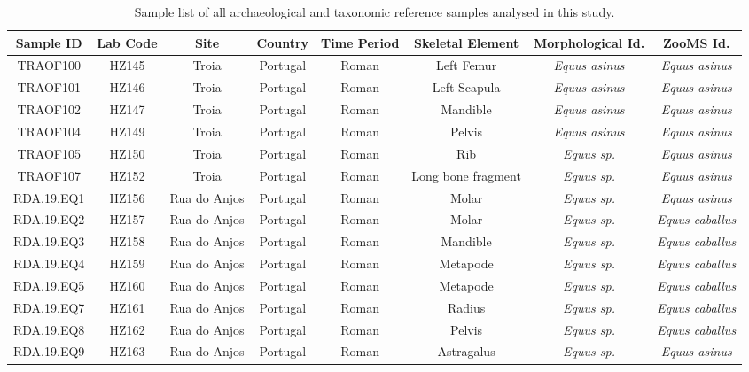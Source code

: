 \documentclass[preprint, 3p, authoryear]{elsarticle} %
\begin{document}
\begin{landscape}\begin{table}

\caption{\label{tab:eqtable3}Sample list of all archaeological and taxonomic reference samples analysed in this study.}
\centering
\fontsize{7}{9}\selectfont
\begin{tabular}[t]{cccccc>{}c>{}c}
\toprule
Sample ID & Lab Code & Site & Country & Time Period & Skeletal Element & Morphological Id. & ZooMS Id.\\
\midrule
TRAOF100 & HZ145 & Troia & Portugal & Roman & Left Femur & \em{Equus asinus} & \em{Equus asinus}\\
TRAOF101 & HZ146 & Troia & Portugal & Roman & Left Scapula & \em{Equus asinus} & \em{Equus asinus}\\
TRAOF102 & HZ147 & Troia & Portugal & Roman & Mandible & \em{Equus asinus} & \em{Equus asinus}\\
TRAOF104 & HZ149 & Troia & Portugal & Roman & Pelvis & \em{Equus asinus} & \em{Equus asinus}\\
TRAOF105 & HZ150 & Troia & Portugal & Roman & Rib & \em{Equus {\normalfont sp.}} & \em{Equus asinus}\\
TRAOF107 & HZ152 & Troia & Portugal & Roman & Long bone fragment & \em{Equus {\normalfont sp.}} & \em{Equus asinus}\\
RDA.19.EQ1 & HZ156 & Rua do Anjos & Portugal & Roman & Molar & \em{Equus {\normalfont sp.}} & \em{Equus asinus}\\
RDA.19.EQ2 & HZ157 & Rua do Anjos & Portugal & Roman & Molar & \em{Equus {\normalfont sp.}} & \em{Equus caballus}\\
RDA.19.EQ3 & HZ158 & Rua do Anjos & Portugal & Roman & Mandible & \em{Equus {\normalfont sp.}} & \em{Equus caballus}\\
RDA.19.EQ4 & HZ159 & Rua do Anjos & Portugal & Roman & Metapode & \em{Equus {\normalfont sp.}} & \em{Equus caballus}\\
RDA.19.EQ5 & HZ160 & Rua do Anjos & Portugal & Roman & Metapode & \em{Equus {\normalfont sp.}} & \em{Equus caballus}\\
RDA.19.EQ7 & HZ161 & Rua do Anjos & Portugal & Roman & Radius & \em{Equus {\normalfont sp.}} & \em{Equus caballus}\\
RDA.19.EQ8 & HZ162 & Rua do Anjos & Portugal & Roman & Pelvis & \em{Equus {\normalfont sp.}} & \em{Equus caballus}\\
RDA.19.EQ9 & HZ163 & Rua do Anjos & Portugal & Roman & Astragalus & \em{Equus {\normalfont sp.}} & \em{Equus asinus}\\

\end{tabular}
\end{table}
\end{landscape}
\end{document}
